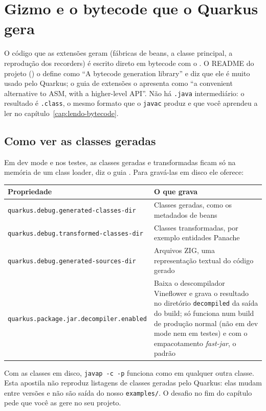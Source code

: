 \section{Gizmo e o bytecode que o Quarkus gera}
\label{sec:gizmo}

O código que as extensões geram (fábricas de beans, a classe principal,
a reprodução dos recorders) é escrito direto em bytecode com o
. O
README do projeto () o define como \enquote{A
bytecode generation library} e diz que ele é muito usado pelo Quarkus; o
guia de extensões o apresenta como \enquote{a convenient alternative to
ASM, with a higher-level API}. Não há \texttt{.java} intermediário: o
resultado é \texttt{.class}, o mesmo formato que o \texttt{javac} produz e
que você aprendeu a ler no capítulo~\ref{cap:lendo-bytecode}.

\subsection*{Como ver as classes geradas}

Em dev mode e nos testes, as classes geradas e transformadas ficam só na
memória de um class loader, diz o guia . Para
gravá-las em disco ele oferece:

\small
\begin{longtable}{@{}p{5.6cm} p{6.6cm}@{}}
\toprule
Propriedade & O que grava \\
\midrule \endhead
\texttt{quarkus.debug.\allowbreak generated-classes-dir} & Classes geradas, como os
  metadados de beans \\
\texttt{quarkus.debug.\allowbreak transformed-classes-dir} & Classes transformadas,
  por exemplo entidades Panache \\
\texttt{quarkus.debug.\allowbreak generated-sources-dir} & Arquivos ZIG, uma
  representação textual do código gerado \\
\texttt{quarkus.package.jar.\allowbreak decompiler.enabled} & Baixa o descompilador
  Vineflower e grava o resultado no diretório \texttt{decompiled} da
  saída do build; só funciona num build de produção normal (não em dev
  mode nem em testes) e com o empacotamento \emph{fast-jar}, o padrão \\
\bottomrule
\end{longtable}
\normalsize

Com as classes em disco, \texttt{javap -c -p} funciona como em qualquer
outra classe. Esta apostila não reproduz listagens de classes geradas
pelo Quarkus: elas mudam entre versões e não são saída do nosso
\texttt{examples/}. O desafio no fim do capítulo pede que você as gere no
seu projeto.

